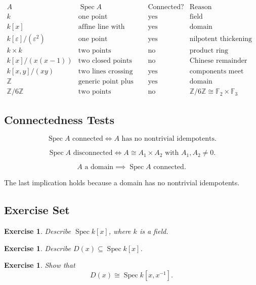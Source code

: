 \documentclass[12pt,a4paper]{article}
\newtheorem{exercise}[definition]{Exercise}
\newcommand{\Z}{\mathbb{Z}}
\newcommand{\Spec}{\operatorname{Spec}}
\newcommand{\F}{\mathbb F}
\begin{document}
\[
\begin{array}{c|c|c|c}
	A & \Spec A & \text{Connected?} & \text{Reason}\\
	\hline
	k & \text{one point} & \text{yes} & \text{field}\\
	k[x] & \text{affine line with generic point} & \text{yes} & \text{domain}\\
	k[\varepsilon]/(\varepsilon^2) & \text{one point topologically} & \text{yes} & \text{nilpotent thickening}\\
	k\times k & \text{two points} & \text{no} & \text{product ring}\\
	k[x]/(x(x-1)) & \text{two closed points} & \text{no} & \text{Chinese remainder theorem}\\
	k[x,y]/(xy) & \text{two lines crossing} & \text{yes} & \text{components meet}\\
	\Z & \text{generic point plus primes} & \text{yes} & \text{domain}\\
	\Z/6\Z & \text{two points} & \text{no} & \Z/6\Z\cong\F_2\times\F_3
\end{array}
\]

\subsection{Connectedness Tests}

\[
\boxed{
	\Spec A\text{ connected}
	\iff
	A\text{ has no nontrivial idempotents}.
}
\]

\[
\boxed{
	\Spec A\text{ disconnected}
	\iff
	A\cong A_1\times A_2
	\text{ with }A_1,A_2\neq 0.
}
\]

\[
\boxed{
	A\text{ a domain}
	\implies
	\Spec A\text{ connected}.
}
\]

The last implication holds because a domain has no nontrivial idempotents.

\subsection{Exercise Set}

\begin{exercise}
	Describe \(\Spec k[x]\), where \(k\) is a field.
\end{exercise}

\begin{exercise}
	Describe \(D(x)\subseteq \Spec k[x]\).
\end{exercise}

\begin{exercise}
	Show that
	\[
	D(x)\cong \Spec k[x,x^{-1}].
	\]
\end{exercise}
\end{document}
